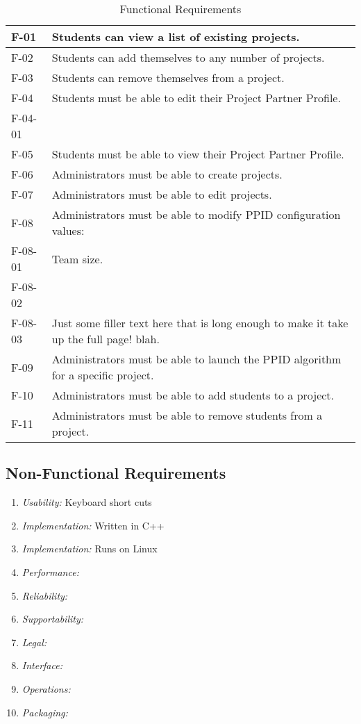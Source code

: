 \documentclass[12pt,letterpaper]{article}
\begin{document}
\begin{table}[H]
\caption{Functional Requirements}
\renewcommand{\arraystretch}{1.5}
\begin{tabularx}{\textwidth}{l|X}
\hline
F-01 & Students can view a list of existing projects. \\ \hline
F-02 & Students can add themselves to any number of projects. \\ \hline
F-03 & Students can remove themselves from a project. \\ \hline
F-04 & Students must be able to edit their Project Partner Profile. \\ \hline
F-04-01 & \\ \hline
F-05 & Students must be able to view their Project Partner Profile. \\ \hline
F-06 & Administrators must be able to create projects. \\ \hline
F-07 & Administrators must be able to edit projects. \\ \hline
F-08 & Administrators must be able to modify PPID configuration values: \\ \hline
F-08-01 & Team size. \\ \hline
F-08-02 & \\ \hline
F-08-03 & Just some filler text here that is long enough to make it take up the full page! blah. \\ \hline
F-09 & Administrators must be able to launch the PPID algorithm for a specific project. \\ \hline
F-10 & Administrators must be able to add students to a project. \\ \hline
F-11 & Administrators must be able to remove students from a project. \\ \hline
\end{tabularx}
\end{table}

\subsection{Non-Functional Requirements}

\begin{enumerate}[\bf NF-1]
\item \textit{Usability:} Keyboard short cuts
\item \textit{Implementation:} Written in C++
\item \textit{Implementation:} Runs on Linux
\item \textit{Performance:}
\item \textit{Reliability:}
\item \textit{Supportability:}
\item \textit{Legal:}
\item \textit{Interface:}
\item \textit{Operations:}
\item \textit{Packaging:}
\end{enumerate}
\end{document}
